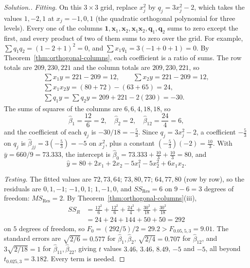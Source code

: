 \documentclass[11pt,a4paper]{article}
\numberwithin{equation}{section}
\theoremstyle{definition}
\newenvironment{solution}
  {\renewcommand{\qedsymbol}{}\begin{proof}[\textit{Solution}.]}
  {\end{proof}}
\begin{document}
\begin{solution}
\emph{Fitting.} On this $3 \times 3$ grid, replace $x_j^2$ by $q_j = 3x_j^2 - 2$, which takes the values $1, -2, 1$ at
$x_j = -1, 0, 1$ (the quadratic orthogonal polynomial for three levels). Every one of the columns
$\mathbf{1}, \mathbf{x}_1, \mathbf{x}_2, \mathbf{x}_1\mathbf{x}_2, \mathbf{q}_1, \mathbf{q}_2$ sums to zero except the first, and every product of two of them
sums to zero over the grid. For example, $\sum q_1q_2 = (1 - 2 + 1)^2 = 0$, and $\sum x_1q_1 = 3(-1 + 0 + 1) = 0$. By
Theorem~\ref{thm:orthogonal-columns}, each coefficient is a ratio of sums. The row totals are $209, 230, 221$ and the
column totals are $209, 230, 221$, so
\begin{gather*}
\textstyle\sum x_1y = 221 - 209 = 12, \qquad \sum x_2y = 221 - 209 = 12, \\
\textstyle\sum x_1x_2y = (80 + 72) - (63 + 65) = 24, \\
\textstyle\sum q_1y = \sum q_2y = 209 + 221 - 2(230) = -30 .
\end{gather*}
The sums of squares of the columns are $6, 6, 4, 18, 18$, so
\[
\hat\beta_1 = \frac{12}{6} = 2, \quad \hat\beta_2 = 2, \quad \hat\beta_{12} = \frac{24}{4} = 6 ,
\]
and the coefficient of each $q_j$ is $-30/18 = -\frac53$.
Since $q_j = 3x_j^2 - 2$, a coefficient $-\frac53$ on $q_j$ is $\hat\beta_{jj} = 3(-\frac53) = -5$ on $x_j^2$, plus a constant $(-\frac53)(-2) = \frac{10}{3}$. With
$\bar y = 660/9 = 73.333$, the intercept is $\hat\beta_0 = 73.333 + \frac{10}{3} + \frac{10}{3} = 80$, and
\[
\hat y = 80 + 2x_1 + 2x_2 - 5x_1^2 - 5x_2^2 + 6x_1x_2 .
\]

\emph{Testing.} The fitted values are $72, 73, 64$; $73, 80, 77$; $64, 77, 80$ (row by row), so the residuals are
$0, 1, -1$; $-1, 0, 1$; $1, -1, 0$, and $SS_{\mathrm{Res}} = 6$ on $9 - 6 = 3$ degrees of freedom: $MS_{\mathrm{Res}} = 2$. By
Theorem~\ref{thm:orthogonal-columns}(iii),
\begin{align*}
SS_R &= \frac{12^2}{6} + \frac{12^2}{6} + \frac{24^2}{4} + \frac{30^2}{18} + \frac{30^2}{18} \\
&= 24 + 24 + 144 + 50 + 50 = 292
\end{align*}
on $5$ degrees of freedom, so $F_0 = (292/5)/2 = 29.2 > F_{0.05,5,3} = 9.01$. The standard errors are $\sqrt{2/6} = 0.577$ for
$\hat\beta_1, \hat\beta_2$, $\sqrt{2/4} = 0.707$ for $\hat\beta_{12}$, and $3\sqrt{2/18} = 1$ for $\hat\beta_{11}, \hat\beta_{22}$, giving $t$ values $3.46$, $3.46$, $8.49$, $-5$
and $-5$, all beyond $t_{0.025,3} = 3.182$. Every term is needed.


\end{solution}
\end{document}
